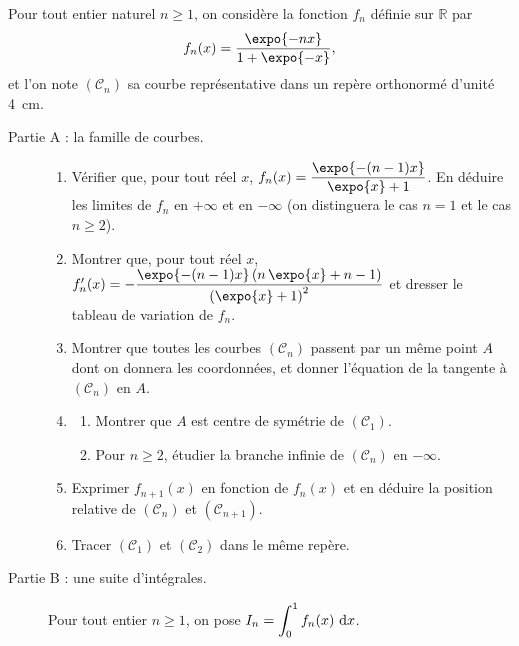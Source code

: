 \begin{exo}
\label{exo:pb famille fn}
      Pour tout entier naturel $n \geq 1$, on consid\`ere la fonction $f_n$ d\'efinie sur $\mathbb{R}$ par
      \[
            f_n(x) = \frac{\expo{-nx}}{1 + \expo{-x}} ,
      \]
      et l'on note $(\mathscr{C}_n)$ sa courbe repr\'esentative dans un rep\`ere orthonorm\'e d'unit\'e 4~cm.
      \begin{description}
            \item[Partie A : la famille de courbes.]
                  \begin{enumerate}
                        \item V\'erifier que, pour tout r\'eel $x$, $f_n(x) = \dfrac{\expo{-(n-1)x}}{\expo{x} + 1}$.
                              En d\'eduire les limites de $f_n$ en $+\infty$ et en $-\infty$
                              (on distinguera le cas $n = 1$ et le cas $n \geq 2$).
                        \item Montrer que, pour tout r\'eel $x$,
                              $f_n'(x) = - \dfrac{\expo{-(n-1)x} \left( n\,\expo{x} + n - 1 \right)}{\left( \expo{x} + 1 \right)^2}$
                              et dresser le tableau de variation de $f_n$.
                        \item Montrer que toutes les courbes $(\mathscr{C}_n)$ passent par un m\^eme point $A$ dont on donnera les
                              coordonn\'ees, et donner l'\'equation de la tangente \`a $(\mathscr{C}_n)$ en $A$.
                        \item \begin{enumerate}
                                    \item Montrer que $A$ est centre de sym\'etrie de $(\mathscr{C}_1)$.
                                    \item Pour $n \geq 2$, \'etudier la branche infinie de $(\mathscr{C}_n)$ en $-\infty$.
                              \end{enumerate}
                        \item Exprimer $f_{n+1}(x)$ en fonction de $f_n(x)$ et en d\'eduire la position relative
                              de $(\mathscr{C}_n)$ et $(\mathscr{C}_{n+1})$.
                        \item Tracer $(\mathscr{C}_1)$ et $(\mathscr{C}_2)$ dans le m\^eme rep\`ere.
                  \end{enumerate}
            \item[Partie B : une suite d'int\'egrales.]
                  Pour tout entier $n \geq 1$, on pose $\displaystyle I_n = \int_0^1 f_n(x) ~\mathrm{d}x$.

\end{description}
\end{exo}
